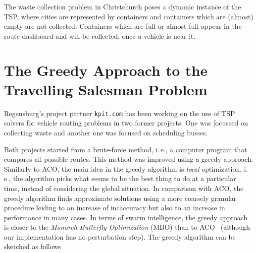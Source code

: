 \documentclass[10pt]{article}
\begin{document}
The waste collection problem in Christchurch poses a dynamic instance of the TSP, where cities are represented by containers and containers which are (almost) empty are not collected. Containers which are full or almost full appear in the route dashboard and 
will be collected, once a vehicle is near it.

\section{The Greedy Approach to the Travelling Salesman Problem}
\label{sec:kpit}

Regensburg's project partner {\tt kpit.com} has been working on the use of TSP solvers
for vehicle routing problems in two former projects: One was focussed on collecting 
waste and another one was focused on scheduling busses.

Both projects started from a brute-force method, i.\,e., a computer program that
compares all possible routes. This method was improved using a greedy approach.
Similarly to ACO, the main idea in the greedy algorithm is {\it local} optimization,
i.\,e., the algorithm picks what seems to be the best thing to do at a particular time, instead of considering the global situation. In comparison with ACO,
the greedy algorithm finds approximate solutions using a more coarsely granular
procedure leiding to an increase of incaccuracy but also to an increase in performance
in many cases. 
In terms of swarm intelligence, the greedy approach is closer to the {\it Monarch
Butterfly Optimization} (MBO) than to ACO~\cite{chen17} (although our implementation
has no perturbation step). 
The greedy algorithm can be sketched as follows
\end{document}
